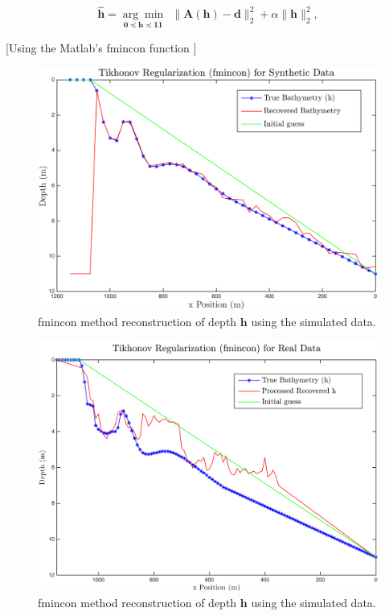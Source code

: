 \begin{equation}\label{LS-regBC}
\mathbf{\hat{h}} = \underset{\mathbf{0} \preceq \mathbf{h} \preceq \mathbf{11}}{\arg \min} \ \ \|  \mathbf{A}(\mathbf{h}) -  \mathbf{d} \|_2^2  +  \alpha \| \mathbf{h}\|_2^2,
\end{equation}

[Using the Matlab's fmincon function ]


\begin{figure}[H]
\center
\includegraphics[scale=0.47]{img/fmincon_simulated_25_new.png} %
\caption{fmincon method reconstruction of depth $\mathbf{h}$ using the simulated data.}
\label{fmincon_simulated}
\end{figure}

\begin{figure}[H]
\center
\includegraphics[scale=0.46]{img/fmincon_real_data_oct09.png} %
\caption{fmincon method reconstruction of depth $\mathbf{h}$ using the simulated data.}
\label{fmincon_simulated}
\end{figure}




